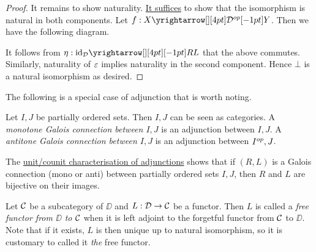 \begin{proof}
  It remains to show naturality. 
  \hyperlink{nat_trans_prod_cat}{It suffices} to show that 
  the isomorphism is natural in both components. 
  Let $f : \map{X}{Y}{\DD\op}{}$. 
  Then we have the following diagram. 
  \begin{figure}[H]
    \centering
  \end{figure}
  It follows from $\eta : \map{\id{\DD}}{RL}{}{}$ that the above commutes.
  Similarly, naturality of $\varepsilon$ implies naturality in the second component. 
  Hence $\bot$ is a natural isomorphism as desired. 
\end{proof}

\begin{rmk}
  The following is a special case of adjunction that is worth noting. 
\end{rmk}
\begin{dfn}
  
  Let $I, J$ be partially ordered sets. 
  Then $I, J$ can be seen as categories. 
  A \emph{monotone Galois connection between $I,J$} is 
  an adjunction between $I, J$.
  A \emph{antitone Galois connection between $I,J$} is 
  an adjunction between $I^{op}, J$. 
\end{dfn}
\begin{rmk}
  The \hyperlink{unit_char_adj}{unit/counit characterisation of adjunctions}
  shows that if $(R,L)$ is a Galois connection (mono or anti) between 
  partially ordered sets $I,J$, 
  then $R$ and $L$ are bijective on their images. 
\end{rmk}

\begin{dfn}
  
  Let $\mathcal{C}$ be a subcategory of $\DD$ and 
  $L : \mathcal{D} \to \mathcal{C}$ be a functor. 
  Then $L$ is called a \emph{free functor from $\DD$ to $\mathcal{C}$} when 
  it is left adjoint to the forgetful functor from $\mathcal{C}$ to $\DD$. 
  Note that if it exists, $L$ is then unique up to natural isomorphism,
  so it is customary to called it \emph{the} free functor. 
\end{dfn}

